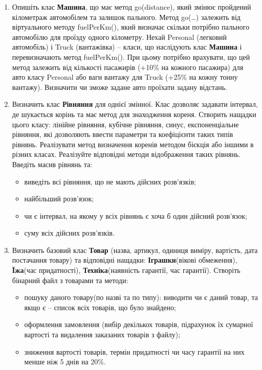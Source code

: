 \documentclass[a5paper,titlepage,openany,twoside,
]
{book_unv}%
\begin{document}
\begin{enumerate}
\item
  Опишіть клас \textbf{Машина}, що має метод go(distance), який змінює пройдений
  кілометраж автомобілем та залишок пального. Метод go(\ldots{})
  залежить від віртуального методу fuelPerKm(), який визначає скільки
  потрібно пального автомобілю для проїзду одного кілометру. Нехай
  Personal (легковий автомобіль) і Truck (вантажівка) -- класи, що
  наслідують клас \textbf{Машина} і перевизначають метод fuelPerKm(). При цьому
  потрібно врахувати, що цей метод залежить від кількості пасажирів
  (+10\% на кожного пасажира) для авто класу Personal або ваги вантажу
  для Truck (+25\% на кожну тонну вантажу). Визначити чи зможе задане
  авто проїхати задану відстань.

\item
Визначить клас \textbf{Рівняння} для однієї змінної. Клас дозволяє задавати інтервал,
де шукається корінь та має метод для знаходження кореня.
Створить нащадки цього класу: лінійне рівняння, кубічне рівняння, синус,
експоненціальне рівняння, які дозволяють ввести параметри та коефіцієнти таких типів
рівнянь. Реалізувати метод визначення коренів методом бієкція або іншими
в різних класах. Реалізуйте відповідні методи відображення таких рівнянь.
Введіть масив рівнянь та:
\begin{itemize}
\item
виведіть всі рівняння, що не мають дійсних розв'язків;
\item
найбільший розв'язок;
\item
чи є інтервал, на якому у всіх рівнянь є хоча б один дійсний розв'язок;
\item
суму всіх дійсних розв'язків.
\end{itemize}

\item
Визначить базовий клас \textbf{Товар} 
(назва, артикул, одиниця виміру, вартість, дата постачання товару) та відповідні нащадки:
\textbf{Іграшки}(вікові обмеження), \textbf{Їжа}(час придатності), \textbf{Техніка}(наявність гарантії, час гарантії).
Створіть бінарний файл з товарами та методи:
\begin{itemize}
\item
 пошуку даного товару(по назві та по типу): 
виводити чи є даний товар, та якщо є -- 
список всіх товарів, що було знайдено; 
\item
оформлення замовлення (вибір декількох товарів, 
підрахунок їх сумарної вартості та видалення
 заказаних товарів з файлу);
\item
зниження вартості товарів, термін придатності чи часу гарантії на них менше ніж 5 днів на 20\%.
\end{itemize}


\end{enumerate}
\end{document}
